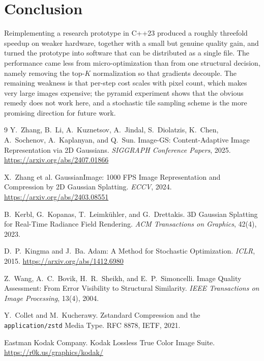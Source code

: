 \documentclass[11pt,a4paper]{article}
\begin{document}
\section{Conclusion}

Reimplementing a research prototype in C++23 produced a roughly threefold speedup on weaker hardware, together with a small but genuine quality gain, and turned the prototype into software that can be distributed as a single file. The performance came less from micro-optimization than from one structural decision, namely removing the top-$K$ normalization so that gradients decouple. The remaining weakness is that per-step cost scales with pixel count, which makes very large images expensive; the pyramid experiment shows that the obvious remedy does not work here, and a stochastic tile sampling scheme is the more promising direction for future work.

\newpage

\begin{thebibliography}{9}
\small
{}
Y.~Zhang, B.~Li, A.~Kuznetsov, A.~Jindal, S.~Diolatzis, K.~Chen, A.~Sochenov,
A.~Kaplanyan, and Q.~Sun.
\newblock Image-GS: Content-Adaptive Image Representation via 2D Gaussians.
\newblock \emph{SIGGRAPH Conference Papers}, 2025.
\url{https://arxiv.org/abs/2407.01866}

X.~Zhang et al.
\newblock GaussianImage: 1000 FPS Image Representation and Compression by 2D
Gaussian Splatting.
\newblock \emph{ECCV}, 2024. \url{https://arxiv.org/abs/2403.08551}

B.~Kerbl, G.~Kopanas, T.~Leimk\"uhler, and G.~Drettakis.
\newblock 3D Gaussian Splatting for Real-Time Radiance Field Rendering.
\newblock \emph{ACM Transactions on Graphics}, 42(4), 2023.

D.~P.~Kingma and J.~Ba.
\newblock Adam: A Method for Stochastic Optimization.
\newblock \emph{ICLR}, 2015. \url{https://arxiv.org/abs/1412.6980}

Z.~Wang, A.~C.~Bovik, H.~R.~Sheikh, and E.~P.~Simoncelli.
\newblock Image Quality Assessment: From Error Visibility to Structural
Similarity.
\newblock \emph{IEEE Transactions on Image Processing}, 13(4), 2004.

Y.~Collet and M.~Kucherawy.
\newblock Zstandard Compression and the \texttt{application/zstd} Media Type.
\newblock RFC 8878, IETF, 2021.

Eastman Kodak Company.
\newblock Kodak Lossless True Color Image Suite.
\newblock \url{https://r0k.us/graphics/kodak/}
\end{thebibliography}
\end{document}
